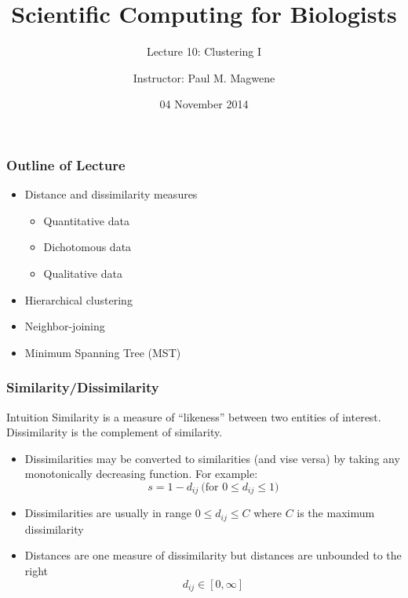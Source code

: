 \documentclass{beamer}
\title{Scientific Computing for Biologists}
\subtitle{Lecture 10: Clustering I}
\author{Instructor: Paul M. Magwene}
\date{04 November 2014}
\begin{document}
\begin{frame}
\titlepage
\end{frame}



\begin{frame}
  \frametitle{Outline of Lecture}
  
\begin{itemize}
    \item Distance and dissimilarity measures
    \begin{itemize}
        \item Quantitative data
        \item Dichotomous data
        \item Qualitative data
    \end{itemize}
    \item Hierarchical clustering
    \item Neighbor-joining
    \item Minimum Spanning Tree (MST)
\end{itemize}     
  
\end{frame}

\begin{frame}
  \frametitle{Similarity/Dissimilarity}

\begin{block}{Intuition}
Similarity is a measure of ``likeness'' between two entities of interest. Dissimilarity is the complement of similarity.
\end{block}


\begin{itemize}

\item Dissimilarities may be converted to similarities (and vise versa) by taking any monotonically decreasing function. For example:
\[
s = 1 - d_{ij}  \ \mbox{(for $0 \leq d_{ij} \leq 1$)}
\]

\item Dissimilarities are usually in range $0 \leq d_{ij} \leq C$ where $C$ is the maximum dissimilarity

\item Distances are one measure of dissimilarity but distances are unbounded to the right
\[
d_{ij} \in [0,\infty]
\]
\end{itemize}
\end{frame}
\end{document}
